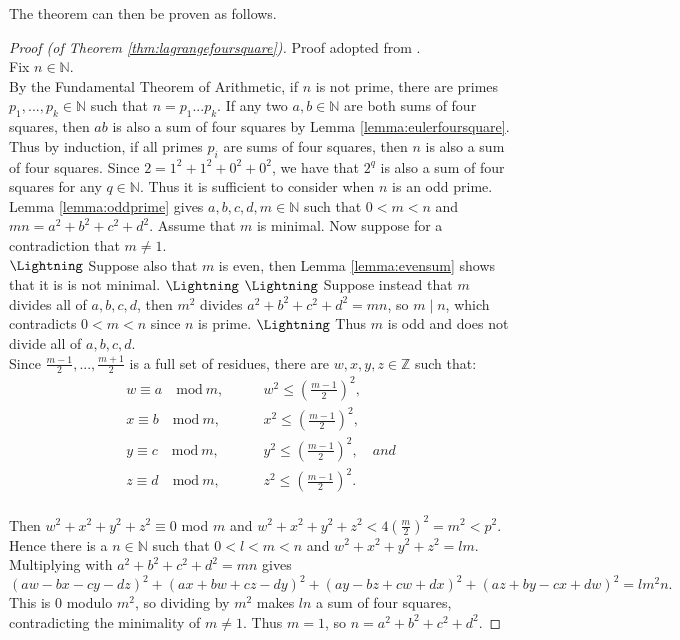 \documentclass{report}
\newcommand{\N}{\mathbb{N}}
\newcommand{\Z}{\mathbb{Z}}
\theoremstyle{definition}\newtheorem*{definition}{Definition}
\theoremstyle{definition}\newtheorem*{example}{Example}
\theoremstyle{remark}\newtheorem*{remark}{Remark}
\begin{document}
The theorem can then be proven as follows.

\begin{proof}[Proof (of Theorem \ref{thm:lagrangefoursquare})]
Proof adopted from \cite{lagrange}. \\
Fix $ n \in \N $. \\
By the Fundamental Theorem of Arithmetic, if $ n $ is not prime, there are primes $ p_1, ..., p_k \in \N $ such that $ n = p_1 ... p_k $. If any two $ a, b \in \N $ are both sums of four squares, then $ ab $ is also a sum of four squares by Lemma \ref{lemma:eulerfoursquare}. Thus by induction, if all primes $ p_i $ are sums of four squares, then $ n $ is also a sum of four squares. Since $ 2 = 1^2 + 1^2 + 0^2 + 0^2 $, we have that $ 2^q $ is also a sum of four squares for any $ q \in \N $. Thus it is sufficient to consider when $ n $ is an odd prime. \\
Lemma \ref{lemma:oddprime} gives $ a, b, c, d, m \in \N $ such that $ 0 < m < n $ and $ mn = a^2 + b^2 + c^2 + d^2 $. Assume that $ m $ is minimal. Now suppose for a contradiction that $ m \ne 1 $. \\
$ \text{\Lightning} $ Suppose also that $ m $ is even, then Lemma \ref{lemma:evensum} shows that it is is not minimal. $ \text{\Lightning} $ $ \text{\Lightning} $ Suppose instead that $ m $ divides all of $ a, b, c, d $, then $ m^2 $ divides $ a^2 + b^2 + c^2 + d^2 = mn $, so $ m \mid n $, which contradicts $ 0 < m < n $ since $ n $ is prime. $ \text{\Lightning} $ Thus $ m $ is odd and does not divide all of $ a, b, c, d $. \\
Since $ \frac{m - 1}{2}, ..., \frac{m + 1}{2} $ is a full set of residues, there are $ w, x, y, z \in \Z $ such that:
\begin{align*}
w \equiv a \quad \text{mod} \ m, & \qquad w^2 \le \left( \frac{m - 1}{2} \right)^2, \\
x \equiv b \quad \text{mod} \ m, & \qquad x^2 \le \left( \frac{m - 1}{2} \right)^2, \\
y \equiv c \quad \text{mod} \ m, & \qquad y^2 \le \left( \frac{m - 1}{2} \right)^2, \quad and \\
z \equiv d \quad \text{mod} \ m, & \qquad z^2 \le \left( \frac{m - 1}{2} \right)^2.
\end{align*} \\
Then $ w^2 + x^2 + y^2 + z^2 \equiv 0 $ mod $ m $ and $ w^2 + x^2 + y^2 + z^2 < 4 \left( \frac{m}{2} \right)^2 = m^2 < p^2 $. Hence there is a $ n \in \N $ such that $ 0 < l < m < n $ and $ w^2 + x^2 + y^2 + z^2 = lm $. Multiplying with $ a^2 + b^2 + c^2 + d^2 = mn $ gives $$ (aw - bx - cy - dz)^2 + (ax + bw + cz - dy)^2 + (ay - bz + cw + dx)^2 + (az + by - cx + dw)^2 = lm^2 n. $$ This is $ 0 $ modulo $ m^2 $, so dividing by $ m^2 $ makes $ ln $ a sum of four squares, contradicting the minimality of $ m \ne 1 $. Thus $ m = 1 $, so $ n = a^2 + b^2 + c^2 + d^2 $.
\end{proof}
\end{document}
